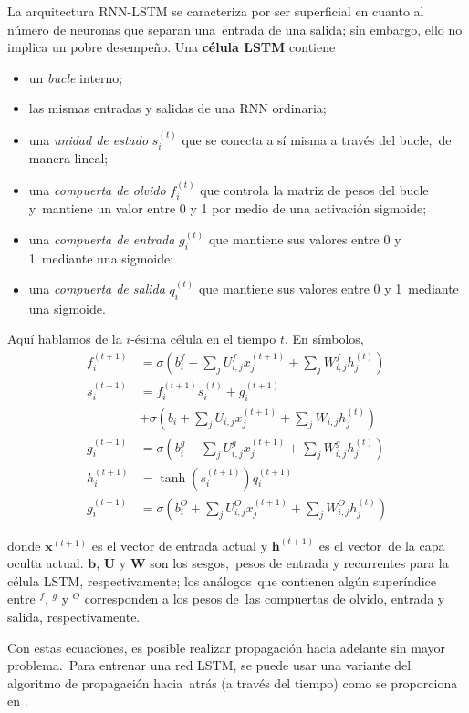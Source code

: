 La arquitectura RNN-LSTM se caracteriza por ser superficial en cuanto al número de neuronas que separan una\
entrada de una salida; sin embargo, ello no implica un pobre desempeño. Una \textbf{célula LSTM} contiene\
\begin{itemize}
\item un \emph{bucle} interno;
\item las mismas entradas y salidas de una RNN ordinaria;
\item una \emph{unidad de estado} $s_i^{(t)}$ que se conecta a sí misma a través del bucle,\
  de manera lineal;
\item una \emph{compuerta de olvido} $f_i^{(t)}$ que controla la matriz de pesos del bucle y\
  mantiene un valor entre 0 y 1 por medio de una activación sigmoide;
\item una \emph{compuerta de entrada} $g_i^{(t)}$ que mantiene sus valores entre 0 y 1\
  mediante una sigmoide;
\item una \emph{compuerta de salida} $q_i^{(t)}$ que mantiene sus valores entre 0 y 1\
  mediante una sigmoide.
\end{itemize}
Aquí hablamos de la $i$-ésima célula en el tiempo $t$. En símbolos,
\begin{align}
  f_i^{(t+1)} &= \sigma\left(b_i^f + \sum_j U_{i,j}^f x_j^{(t+1)} + \sum_j W_{i,j}^f h_j^{(t)}\right)\\
  s_i^{(t+1)} &= f_i^{(t+1)} s_i^{(t)} + g_i^{(t+1)} \nonumber \\
  &+ \sigma\left(b_i + \sum_j U_{i,j} x_j^{(t+1)} + \sum_j W_{i,j} h_j^{(t)}\right)\\
  g_i^{(t+1)} &= \sigma\left(b_i^g + \sum_j U_{i,j}^g x_j^{(t+1)} + \sum_j W_{i,j}^g h_j^{(t)}\right)\\
  h_i^{(t+1)} &= \tanh(s_i^{(t+1)}) q_i^{(t+1)}\\
  g_i^{(t+1)} &= \sigma\left(b_i^O + \sum_j U_{i,j}^O x_j^{(t+1)} + \sum_j W_{i,j}^O h_j^{(t)}\right)
\end{align}\par
donde $\mathbf{x}^{(t+1)}$ es el vector de entrada actual y $\mathbf{h}^{(t+1)}$ es el vector\
de la capa oculta actual. $\mathbf{b}$, $\mathbf{U}$ y $\mathbf{W}$ son los sesgos,\
pesos de entrada y recurrentes para la célula LSTM, respectivamente; los análogos\
que contienen algún superíndice entre $^f$, $^g$ y $^O$ corresponden a los pesos de\
las compuertas de olvido, entrada y salida, respectivamente.\par
Con estas ecuaciones, es posible realizar propagación hacia adelante sin mayor problema.\
Para entrenar una red LSTM, se puede usar una variante del algoritmo de propagación hacia\
atrás (a través del tiempo) como se proporciona en \cite{hochreiter1997}.
